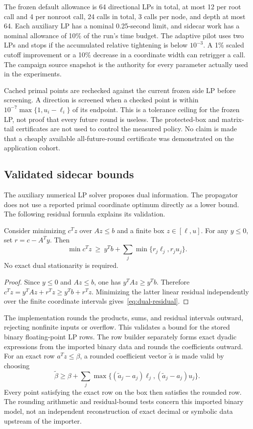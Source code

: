 The frozen default allowance is 64 directional LPs in total, at most
12 per root call and 4 per nonroot call, 24 calls in total, 3 calls per
node, and depth at most 64. Each auxiliary LP has a nominal 0.25-second
limit, and sidecar work has a nominal allowance of 10\% of the run's
time budget. The adaptive pilot uses two LPs and stops if the accumulated
relative tightening is below $10^{-3}$. A 1\% scaled cutoff improvement
or a 10\% decrease in a coordinate width can retrigger a call. The
campaign source snapshot is the authority for every parameter actually
used in the experiments.

Cached primal points are rechecked against the current frozen side LP
before screening. A direction is screened when a checked point is within
$10^{-7}\max\{1,u_i-\ell_i\}$ of its endpoint. This is a tolerance
ceiling for the frozen LP, not proof that every future round is useless.
The protected-box and matrix-tail certificates are not used to control
the measured policy. No claim is made that a cheaply available
all-future-round certificate was demonstrated on the application cohort.

\subsection{Validated sidecar bounds}

The auxiliary numerical LP solver proposes dual information. The
propagator does not use a reported primal coordinate optimum directly as
a lower bound. The following residual formula explains its validation.

\begin{proposition}\label{prop:dual-residual}
Consider minimizing $c^Tz$ over $Az\le b$ and a finite box
$z\in[\ell,u]$. For any $y\le0$, set $r=c-A^Ty$. Then
\begin{equation}\label{eq:dual-residual}
 \min c^Tz\ \ge\ y^Tb+
 \sum_j\min\{r_j\ell_j,r_ju_j\}.
\end{equation}
No exact dual stationarity is required.
\end{proposition}
\begin{proof}
Since $y\le0$ and $Az\le b$, one has $y^TAz\ge y^Tb$.
Therefore $c^Tz=y^TAz+r^Tz\ge y^Tb+r^Tz$. Minimizing the latter
linear residual independently over the finite coordinate intervals
gives~\eqref{eq:dual-residual}.
\end{proof}

The implementation rounds the products, sums, and residual intervals
outward, rejecting nonfinite inputs or overflow. This validates a bound
for the stored binary floating-point LP rows. The row builder separately
forms exact dyadic expressions from the imported binary data and rounds
the coefficients outward. For an exact row $a^Tz\le\beta$, a rounded
coefficient vector $\widetilde a$ is made valid by choosing
\[
 \widetilde\beta\ge\beta+
 \sum_j\max\{(\widetilde a_j-a_j)\ell_j,
              (\widetilde a_j-a_j)u_j\}.
\]
Every point satisfying the exact row on the box then satisfies the
rounded row. The rounding arithmetic and residual-bound tests concern
this imported binary model, not an independent reconstruction of exact
decimal or symbolic data upstream of the importer.

